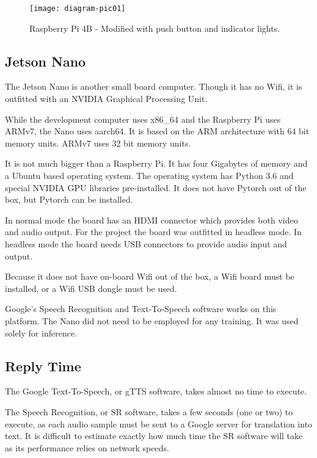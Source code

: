 \begin{figure}[H]
	\begin{center}
		\texttt{[image: diagram-pic01]}
		
		
	\end{center}
	\caption[Raspberry Pi]{Raspberry Pi 4B - Modified with push button and indicator lights.}
	
	
\end{figure}

\subsection{Jetson Nano}

The Jetson Nano is another small board computer. Though it has no Wifi, it is outfitted with an NVIDIA Graphical Processing Unit. 

While the development computer uses x86\_64 and the Raspberry Pi uses ARMv7, the Nano uses aarch64. It is based on the ARM architecture with 64 bit memory units. ARMv7 uses 32 bit memory units.

It is not much bigger than a Raspberry Pi. It has four Gigabytes of memory and a Ubuntu based operating system. The operating system has Python 3.6 and special NVIDIA GPU libraries pre-installed. It does not have Pytorch out of the box, but Pytorch can be installed.

In normal mode the board has an HDMI connector which provides both video and audio output. For the project the board was outfitted in headless mode. In headless mode the board needs USB connectors to provide audio input and output.

Because it does not have on-board Wifi out of the box, a Wifi board must be installed, or a Wifi USB dongle must be used.

Google's Speech Recognition and Text-To-Speech software works on this platform. The Nano did not need to be employed for any training. It was used solely for inference.



\subsection{Reply Time}

The Google Text-To-Speech, or gTTS software, takes almost no time to execute.

The Speech Recognition, or SR software, takes a few seconds (one or two) to execute, as each audio sample must be sent to a Google server for translation into text. It is difficult to estimate exactly how much time the SR software will take as its performance relies on network speeds.

